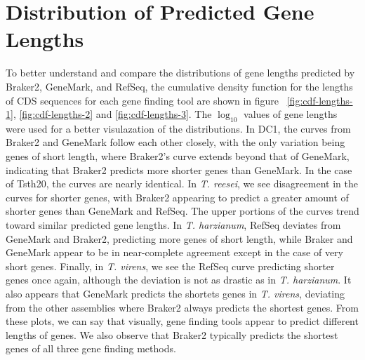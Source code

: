 \section{Distribution of Predicted Gene Lengths}
\label{section:lengths}

To better understand and compare the distributions of gene lengths
predicted by Braker2, GeneMark, and RefSeq, the cumulative density
function for the lengths of CDS sequences for each gene finding tool
are shown in figure ~\ref{fig:cdf-lengths-1}, \ref{fig:cdf-lengths-2}
and \ref{fig:cdf-lengths-3}. The $\log_{10}$ values of gene lengths
were used for a better visulazation of the distributions. In DC1, the
curves from Braker2 and GeneMark follow each other closely, with the
only variation being genes of short length, where Braker2's curve
extends beyond that of GeneMark, indicating that Braker2 predicts more
shorter genes than GeneMark. In the case of Tsth20, the curves are
nearly identical. In \textit{T. reesei}, we see disagreement in the
curves for shorter genes, with Braker2 appearing to predict a greater
amount of shorter genes than GeneMark and RefSeq. The upper portions
of the curves trend toward similar predicted gene lengths. In
\textit{T. harzianum}, RefSeq deviates from GeneMark and Braker2,
predicting more genes of short length, while Braker and GeneMark
appear to be in near-complete agreement except in the case of very
short genes. Finally, in \textit{T. virens}, we see the RefSeq curve
predicting shorter genes once again, although the deviation is not as
drastic as in \textit{T. harzianum}. It also appears that GeneMark
predicts the shortets genes in \textit{T. virens}, deviating from the
other assemblies where Braker2 always predicts the shortest
genes. From these plots, we can say that visually, gene finding tools
appear to predict different lengths of genes. We also observe that
Braker2 typically predicts the shortest genes of all three gene
finding methods.

